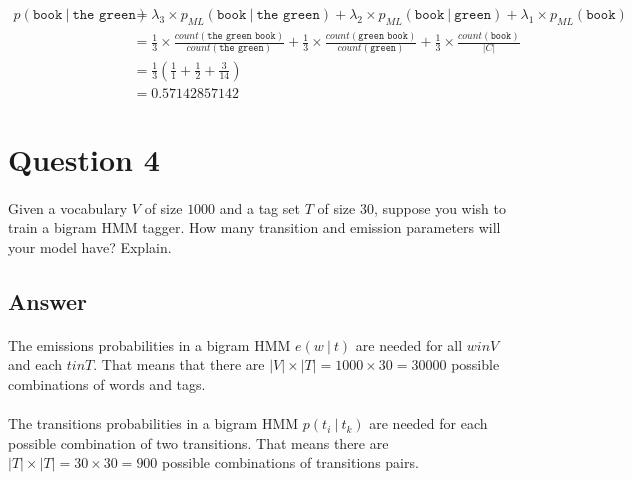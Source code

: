\documentclass{article}
\newcommand\given[1][]{\:#1\vert\:}
\begin{document}
\begin{equation}
\begin{split}
    p(\texttt{book} \given \texttt{the green}) &= \lambda_3 \times p_{ML}(\texttt{book} \given \texttt{the green}) + \lambda_2 \times p_{ML}(\texttt{book} \given \texttt{green}) + \lambda_1 \times p_{ML}(\texttt{book})  \\
    &= \frac{1}{3} \times \frac{count(\texttt{the green book})}{count(\texttt{the green})} + \frac{1}{3} \times \frac{count(\texttt{green book})}{count(\texttt{green})} + \frac{1}{3} \times \frac{count(\texttt{book})}{|C|} \\
    &= \frac{1}{3} (\frac{1}{1} + \frac{1}{2} +  \frac{3}{14}) \\
    &= 0.57142857142
\end{split}
\end{equation}

\clearpage


\section*{Question 4}

\paragraph{} Given a vocabulary $V$ of size $1000$ and a tag set $T$ of size $30$, suppose you wish to train a bigram HMM tagger. How many transition and emission parameters will your model have? Explain.

\subsection*{Answer}

\paragraph{} The emissions probabilities in a bigram HMM $e(w \given t)$ are needed for all $w in V$ and each $t in T$. That means that there are $|V| \times |T| = 1000 \times 30 = 30000$ possible combinations of words and tags.

\paragraph{} The transitions probabilities in a bigram HMM $p(t_i \given t_k)$ are needed for each possible combination of two transitions. That means there are $|T| \times |T| = 30 \times 30 = 900$ possible combinations of transitions pairs.
\end{document}
